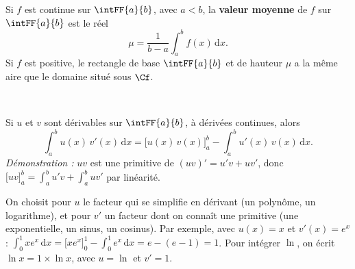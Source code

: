 
\noindent
\begin{minipage}[c]{0.56\linewidth}
\begin{definition}
\raggedright
Si $f$ est continue sur $\intFF{a}{b}$, avec $a<b$, la \textbf{valeur moyenne} de $f$ sur $\intFF{a}{b}$ est le réel
\[ \mu=\frac{1}{b-a}\int_a^bf(x)\,\mathrm{d}x. \]
Si $f$ est positive, le rectangle de base $\intFF{a}{b}$ et de hauteur $\mu$ a la même aire que le domaine situé sous $\Cf$.
\end{definition}
\end{minipage}\hfill
\begin{minipage}[c]{0.4\linewidth}
\centering
{}\\[0.5mm]
\end{minipage}


\begin{theoreme}
Si $u$ et $v$ sont dérivables sur $\intFF{a}{b}$, à dérivées continues, alors
\[ \int_a^bu(x)\,v'(x)\,\mathrm{d}x=\Big[u(x)\,v(x)\Big]_a^b-\int_a^bu'(x)\,v(x)\,\mathrm{d}x. \]
\emph{Démonstration :} $uv$ est une primitive de $(uv)'=u'v+uv'$, donc $\big[uv\big]_a^b=\int_a^bu'v+\int_a^buv'$ par linéarité.
\end{theoreme}

\begin{savoirfaire}[Choisir $u$ et $v'$]
On choisit pour $u$ le facteur qui se simplifie en dérivant (un polynôme, un logarithme), et pour $v'$ un facteur dont on
connaît une primitive (une exponentielle, un sinus, un cosinus). Par exemple, avec $u(x)=x$ et $v'(x)=e^{x}$ :
$\int_0^1xe^{x}\,\mathrm{d}x=\Big[xe^{x}\Big]_0^1-\int_0^1e^{x}\,\mathrm{d}x=e-(e-1)=1$.
Pour intégrer $\ln$, on écrit $\ln x=1\times\ln x$, avec $u=\ln$ et $v'=1$.
\end{savoirfaire}


